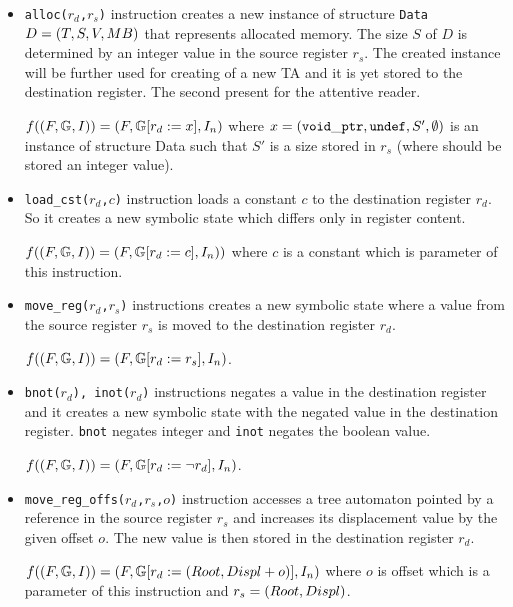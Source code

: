 \begin{itemize}

	\item {\tt alloc($r_d$,$r_s$)} instruction creates a new instance of structure {\tt Data} $D = (T,S,V,MB)$
		that represents allocated memory.
		The size $S$ of $D$ is determined by an integer value in the source register $r_s$.
		The created instance will be further used for creating of a new TA
		and it is yet stored to the destination register.
		The second present for the attentive reader. %
		
		$f((F, \mathbb{G}, I)) = (F, 
		\mathbb{G} [
			r_{d} := x], I_n)$
		where $x=({\tt void\_ptr},{\tt undef},S',\emptyset)$ is an instance of structure Data
		such that $S'$ is a size stored in $r_s$ (where should be stored an integer value). 

	\item {\tt load\_cst($r_d$,$c$)} instruction loads a constant $c$ to the destination register $r_d$.
		So it creates a new symbolic state which differs only in register content.
		
		$f((F, \mathbb{G}, I)) = (F, \mathbb{G} [r_d := c], I_n))$ where
		$c$ is a constant which is parameter of this instruction.
	
	\item {\tt move\_reg($r_d$,$r_s$)} instructions creates a new symbolic state where
		a value from the source register $r_s$ is moved to the destination register $r_d$.
		
		$f((F, \mathbb{G}, I)) = (F, \mathbb{G} [r_d := r_s], I_n)$.
	
	\item {\tt bnot($r_d$), inot($r_d$)} instructions negates a value in the destination register and
		it creates a new symbolic state with the negated value in the destination register.
		{\tt bnot} negates integer and {\tt inot} negates the boolean value.
		
		$f((F, \mathbb{G}, I)) = (F, \mathbb{G} [r_d := \neg r_d], I_n)$.
	
	\item {\tt move\_reg\_offs($r_d$,$r_s$,$o$)} instruction accesses a tree automaton pointed
		by a reference in the source register $r_s$ and increases its displacement value by the given offset $o$.
		The new value is then stored in the destination register $r_d$.
		
		$f((F, \mathbb{G}, I)) = (F, \mathbb{G} [r_d := (Root,Displ+o)], I_n)$
		where $o$ is offset which is a parameter of this instruction
		and $r_s=(Root,Displ)$.
	

\end{itemize}
